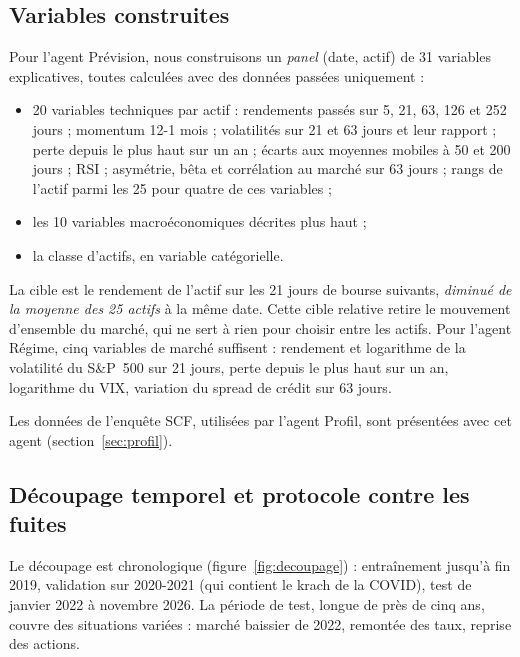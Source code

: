 \subsection{Variables construites}

Pour l'agent Prévision, nous construisons un \emph{panel} (date, actif) de 31 variables explicatives, toutes calculées avec des données passées uniquement :
\begin{itemize}
  \item 20 variables techniques par actif : rendements passés sur 5, 21, 63, 126 et 252 jours ; momentum 12-1 mois ; volatilités sur 21 et 63 jours et leur rapport ; perte depuis le plus haut sur un an ; écarts aux moyennes mobiles à 50 et 200 jours ; RSI ; asymétrie, bêta et corrélation au marché sur 63 jours ; rangs de l'actif parmi les 25 pour quatre de ces variables ;
  \item les 10 variables macroéconomiques décrites plus haut ;
  \item la classe d'actifs, en variable catégorielle.
\end{itemize}
La cible est le rendement de l'actif sur les 21 jours de bourse suivants, \emph{diminué de la moyenne des 25 actifs} à la même date. Cette cible \og relative \fg{} retire le mouvement d'ensemble du marché, qui ne sert à rien pour choisir entre les actifs. Pour l'agent Régime, cinq variables de marché suffisent : rendement et logarithme de la volatilité du S\&P~500 sur 21 jours, perte depuis le plus haut sur un an, logarithme du VIX, variation du spread de crédit sur 63 jours.

Les données de l'enquête SCF, utilisées par l'agent Profil, sont présentées avec cet agent (section~\ref{sec:profil}).

\subsection{Découpage temporel et protocole contre les fuites}

Le découpage est chronologique (figure~\ref{fig:decoupage}) : entraînement jusqu'à fin 2019, validation sur 2020-2021 (qui contient le krach de la COVID), test de janvier 2022 à novembre 2026. La période de test, longue de près de cinq ans, couvre des situations variées : marché baissier de 2022, remontée des taux, reprise des actions.

